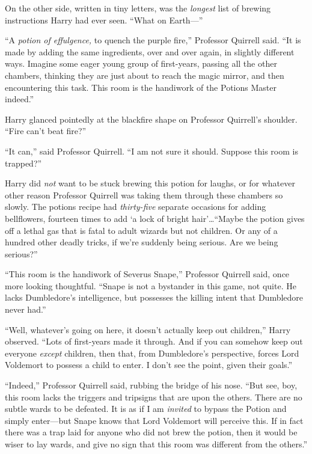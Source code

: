 On the other side, written in tiny letters, was the \emph{longest} list of brewing instructions Harry had ever seen. “What on Earth—”

“A \emph{potion of effulgence,} to quench the purple fire,” Professor Quirrell said. “It is made by adding the same ingredients, over and over again, in slightly different ways. Imagine some eager young group of first-years, passing all the other chambers, thinking they are just about to reach the magic mirror, and then encountering this task. This room is the handiwork of the Potions Master indeed.”

Harry glanced pointedly at the blackfire shape on Professor Quirrell’s shoulder. “Fire can’t beat fire?”

“It can,” said Professor Quirrell. “I am not sure it should. Suppose this room is trapped?”

Harry did \emph{not} want to be stuck brewing this potion for laughs, or for whatever other reason Professor Quirrell was taking them through these chambers so slowly. The potions recipe had \emph{thirty-five} separate occasions for adding bellflowers, fourteen times to add ‘a lock of bright hair’…“Maybe the potion gives off a lethal gas that is fatal to adult wizards but not children. Or any of a hundred other deadly tricks, if we’re suddenly being serious. Are we being serious?”

“This room is the handiwork of Severus Snape,” Professor Quirrell said, once more looking thoughtful. “Snape is not a bystander in this game, not quite. He lacks Dumbledore’s intelligence, but possesses the killing intent that Dumbledore never had.”

“Well, whatever’s going on here, it doesn’t actually keep out children,” Harry observed. “Lots of first-years made it through. And if you can somehow keep out everyone \emph{except} children, then that, from Dumbledore’s perspective, forces Lord Voldemort to possess a child to enter. I don’t see the point, given their goals.”

“Indeed,” Professor Quirrell said, rubbing the bridge of his nose. “But see, boy, this room lacks the triggers and tripsigns that are upon the others. There are no subtle wards to be defeated. It is as if I am \emph{invited} to bypass the Potion and simply enter—but Snape knows that Lord Voldemort will perceive this. If in fact there was a trap laid for anyone who did not brew the potion, then it would be wiser to lay wards, and give no sign that this room was different from the others.”

